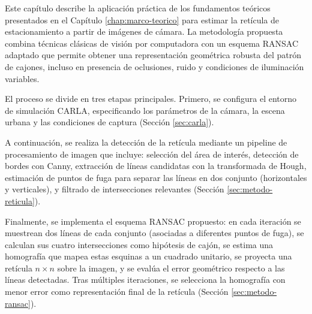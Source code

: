 
Este capítulo describe la aplicación práctica de los fundamentos teóricos presentados en el Capítulo \ref{chap:marco-teorico} para estimar la retícula de estacionamiento a partir de imágenes de cámara. La metodología propuesta combina técnicas clásicas de visión por computadora con un esquema RANSAC adaptado que permite obtener una representación geométrica robusta del patrón de cajones, incluso en presencia de oclusiones, ruido y condiciones de iluminación variables.

El proceso se divide en tres etapas principales. Primero, se configura el entorno de simulación CARLA, especificando los parámetros de la cámara, la escena urbana y las condiciones de captura (Sección \ref{sec:carla}).

A continuación, se realiza la detección de la retícula mediante un pipeline de procesamiento de imagen que incluye: selección del área de interés, detección de bordes con Canny, extracción de líneas candidatas con la transformada de Hough, estimación de puntos de fuga para separar las líneas en dos conjunto (horizontales y verticales), y filtrado de intersecciones relevantes (Sección \ref{sec:metodo-reticula}).

Finalmente, se implementa el esquema RANSAC propuesto: en cada iteración se muestrean dos líneas de cada conjunto (asociadas a diferentes puntos de fuga), se calculan sus cuatro intersecciones como hipótesis de cajón, se estima una homografía que mapea estas esquinas a un cuadrado unitario, se proyecta una retícula $n\times n$ sobre la imagen, y se evalúa el error geométrico respecto a las líneas detectadas. Tras múltiples iteraciones, se selecciona la homografía con menor error como representación final de la retícula (Sección \ref{sec:metodo-ransac}).